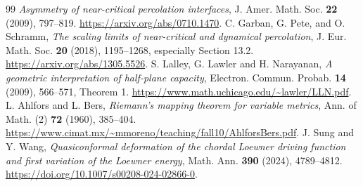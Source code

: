 \documentclass[11pt]{article}
\theoremstyle{definition}\newtheorem{definition}[theorem]{Definition}
\theoremstyle{remark}\newtheorem{remark}[theorem]{Remark}
\begin{document}
\begin{thebibliography}{99}
\emph{Asymmetry of near-critical percolation interfaces},
J. Amer. Math. Soc. \textbf{22} (2009), 797--819.
\url{https://arxiv.org/abs/0710.1470}.
 C. Garban, G. Pete, and O. Schramm,
\emph{The scaling limits of near-critical and dynamical percolation},
J. Eur. Math. Soc. \textbf{20} (2018), 1195--1268,
especially Section 13.2. \url{https://arxiv.org/abs/1305.5526}.
 S. Lalley, G. Lawler and H. Narayanan,
\emph{A geometric interpretation of half-plane capacity},
Electron. Commun. Probab. \textbf{14} (2009), 566--571, Theorem 1.
\url{https://www.math.uchicago.edu/~lawler/LLN.pdf}.
 L. Ahlfors and L. Bers,
\emph{Riemann's mapping theorem for variable metrics},
Ann. of Math. (2) \textbf{72} (1960), 385--404.
\url{https://www.cimat.mx/~mmoreno/teaching/fall10/AhlforsBers.pdf}.
 J. Sung and Y. Wang,
\emph{Quasiconformal deformation of the chordal Loewner driving
function and first variation of the Loewner energy},
Math. Ann. \textbf{390} (2024), 4789--4812.
\url{https://doi.org/10.1007/s00208-024-02866-0}.
\end{thebibliography}
\end{document}
